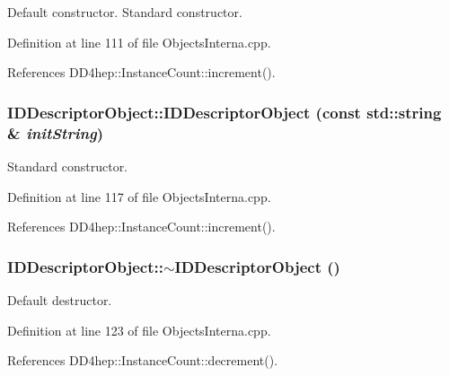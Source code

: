 Default constructor. Standard constructor. 

Definition at line 111 of file ObjectsInterna.cpp.

References DD4hep::InstanceCount::increment().\hypertarget{class_d_d4hep_1_1_geometry_1_1_i_d_descriptor_object_a9255ad3ebfdcc22225b2ca01cfd99442}{
\subsubsection[{IDDescriptorObject}]{\setlength{\rightskip}{0pt plus 5cm}IDDescriptorObject::IDDescriptorObject (const std::string \& {\em initString})}}
\label{class_d_d4hep_1_1_geometry_1_1_i_d_descriptor_object_a9255ad3ebfdcc22225b2ca01cfd99442}


Standard constructor. 

Definition at line 117 of file ObjectsInterna.cpp.

References DD4hep::InstanceCount::increment().\hypertarget{class_d_d4hep_1_1_geometry_1_1_i_d_descriptor_object_ab2e22dcf33d24f258e82973d9851474d}{
\subsubsection[{$\sim$IDDescriptorObject}]{\setlength{\rightskip}{0pt plus 5cm}IDDescriptorObject::$\sim$IDDescriptorObject ()}}
\label{class_d_d4hep_1_1_geometry_1_1_i_d_descriptor_object_ab2e22dcf33d24f258e82973d9851474d}


Default destructor. 

Definition at line 123 of file ObjectsInterna.cpp.

References DD4hep::InstanceCount::decrement().

